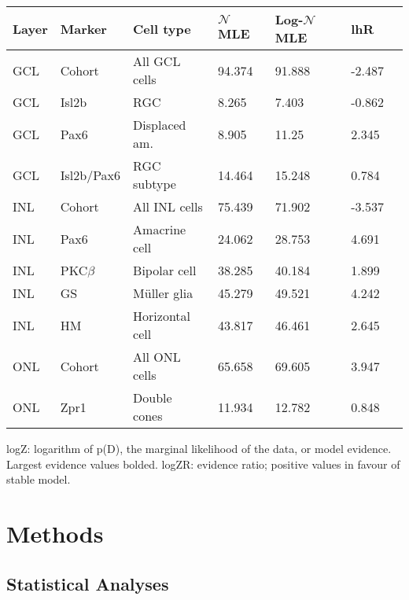 \begin{table}[!ht]
    \begin{tabular}{|l|l|l|l|l|l|l|} 
        \hline
        {\bf Layer} & {\bf Marker} & {\bf Cell type} & {\bf $\mathcal{N}$ MLE} & {\bf Log-$\mathcal{N}$ MLE} & {\bf lhR}\\ \hline \hline
        GCL & Cohort & All GCL cells & 94.374 & 91.888 & -2.487\\ \hline \hline
        GCL & Isl2b & RGC & 8.265 & 7.403 & -0.862\\ \hline
        GCL & Pax6 & Displaced am. &  8.905 & 11.25 & 2.345\\ \hline
        GCL & Isl2b/Pax6 & RGC subtype & 14.464 & 15.248 & 0.784\\ \hline \hline
        INL & Cohort & All INL cells & 75.439 & 71.902 & -3.537\\ \hline \hline
        INL & Pax6 & Amacrine cell & 24.062 & 28.753 & 4.691\\ \hline
        INL & PKC$\beta$ & Bipolar cell & 38.285 & 40.184 & 1.899\\ \hline
        INL & GS & M\"{u}ller glia & 45.279 & 49.521 & 4.242\\ \hline
        INL & HM & Horizontal cell & 43.817 & 46.461 & 2.645\\ \hline \hline
        ONL & Cohort & All ONL cells & 65.658 & 69.605 & 3.947\\ \hline \hline
        ONL & Zpr1 & Double cones & 11.934 & 12.782 & 0.848\\ \hline
    \end{tabular}
   
    \begin{flushleft}logZ: logarithm of p(D), the marginal likelihood of the data, or model evidence.  Largest evidence values bolded. logZR: evidence ratio; positive values in favour of stable model.
    \end{flushleft}
    \label{lineage_lhratio}
\end{table}


\section{Methods}
\label{ssec:CMZmethods}

\subsection{Statistical Analyses}


